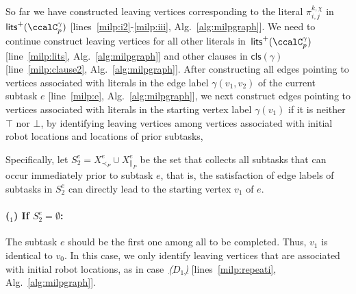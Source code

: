 \documentclass[Afour,sageh,times]{sagej}
\newcounter{mycounter}
\newcommand{\clause}[1]{\mathsf{cls}(#1)}
\renewcommand{\ap}[3]{\mathcal{\pi}_{{#1},{#2}}^{#3}}
\begin{document}
So far we have constructed leaving vertices corresponding to the literal $\ap{i}{j}{k,\chi}$ in $\mathsf{lits}^+(\ccalC_p^{\gamma})$ [lines~\ref{milp:i2}-\ref{milp:iii}, Alg.~\ref{alg:milpgraph}]. We need to continue construct leaving vertices for all other literals in~$\mathsf{lits}^+(\ccalC_p^{\gamma})$ [line~\ref{milp:lits},  Alg.~\ref{alg:milpgraph}] and other clauses in $\clause{\gamma}$ [line~\ref{milp:clause2},  Alg.~\ref{alg:milpgraph}].
After constructing all edges pointing to vertices associated with literals in the edge label $\gamma(v_1, v_2)$ of the current subtask $e$ [line~\ref{milp:e},  Alg.~\ref{alg:milpgraph}], we next construct  edges pointing to vertices associated with literals in the starting vertex label $\gamma(v_1)$ if it is  neither $\top$ nor $\bot$, by identifying leaving vertices among vertices associated with initial robot locations and locations of prior subtasks,


Specifically, let $S_2^e = X_{\prec_P}^e \cup X_{\|_P}^e$ be the set that collects all subtasks that can occur immediately prior to subtask $e$, that is, the satisfaction of edge labels  of subtasks in $S_2^e$  can directly lead to the starting vertex $v_1$ of $e$.
\paragraph{($_1$) If $S_2^e = \emptyset$:}\label{edge:vertex1} The subtask $e$ should be the first one among all to be completed. Thus, $v_1$ is identical to $v_0$. In this case,  we only identify leaving vertices that are associated with initial robot locations, as in case~\hyperref[sec:a]{\it ($D_1$)} [lines~\ref{milp:repeati},  Alg.~\ref{alg:milpgraph}].
\end{document}
